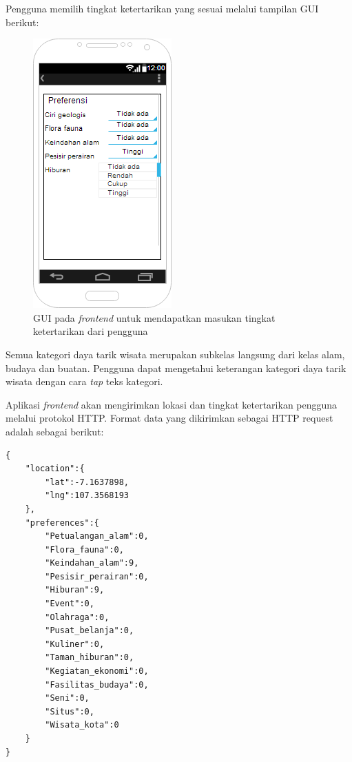 Pengguna memilih tingkat ketertarikan yang sesuai melalui tampilan GUI berikut:
\begin{figure}[h!]
    \centering
    \includegraphics[scale=0.6]{img/gui-pref.png}
    \caption{GUI pada \textit{frontend} untuk mendapatkan masukan tingkat ketertarikan dari pengguna}
    \label{fig:guipref}
\end{figure}
\par
Semua kategori daya tarik wisata merupakan subkelas langsung dari kelas alam, budaya dan buatan. Pengguna dapat mengetahui keterangan kategori daya tarik wisata dengan cara
\textit{tap} teks kategori.

\par
Aplikasi \textit{frontend} akan mengirimkan lokasi dan tingkat ketertarikan pengguna melalui protokol HTTP. Format data yang dikirimkan sebagai HTTP request adalah sebagai
berikut:
\begin{lstlisting}
{	
	"location":{
		"lat":-7.1637898,
		"lng":107.3568193
	},
	"preferences":{
		"Petualangan_alam":0,
		"Flora_fauna":0,
		"Keindahan_alam":9,
		"Pesisir_perairan":0,
		"Hiburan":9,
		"Event":0,
		"Olahraga":0,
		"Pusat_belanja":0,
      	"Kuliner":0,
		"Taman_hiburan":0,
		"Kegiatan_ekonomi":0,
		"Fasilitas_budaya":0,
		"Seni":0,
		"Situs":0,
		"Wisata_kota":0
	}
}
\end{lstlisting}

